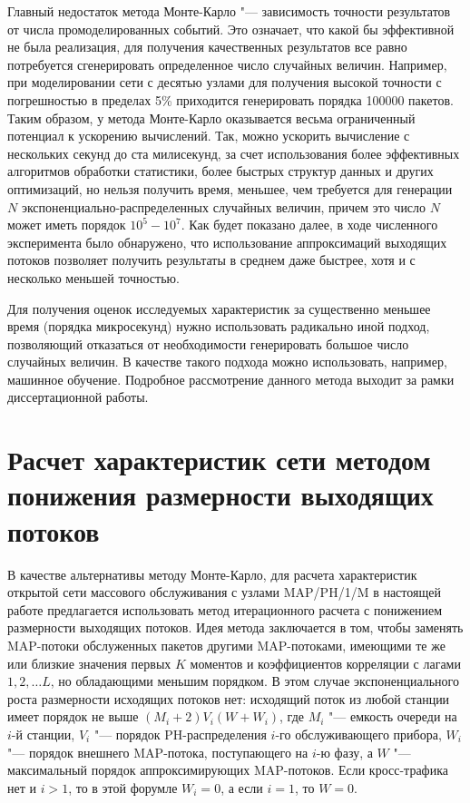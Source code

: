 Главный недостаток метода Монте-Карло "--- зависимость точности результатов от числа промоделированных событий. Это означает, что какой бы эффективной не была реализация, для получения качественных результатов все равно потребуется сгенерировать определенное число случайных величин. Например, при моделировании сети с десятью узлами для получения высокой точности с погрешностью в пределах 5\% приходится генерировать порядка 100000 пакетов. Таким образом, у метода Монте-Карло оказывается весьма ограниченный потенциал к ускорению вычислений. Так, можно ускорить вычисление с нескольких секунд до ста милисекунд, за счет использования более эффективных алгоритмов обработки статистики, более быстрых структур данных и других оптимизаций, но нельзя получить время, меньшее, чем требуется для генерации $N$ экспоненциально-распределенных случайных величин, причем это число $N$ может иметь порядок $10^5-10^7$. Как будет показано далее, в ходе численного эксперимента было обнаружено, что использование аппроксимаций выходящих потоков позволяет получить результаты в среднем даже быстрее, хотя и с несколько меньшей точностью.

Для получения оценок исследуемых характеристик за существенно меньшее время (порядка микросекунд) нужно использовать радикально иной подход, позволяющий отказаться от необходимости генерировать большое число случайных величин. В качестве такого подхода можно использовать, например, машинное обучение. Подробное рассмотрение данного метода выходит за рамки диссертационной работы.


\section{Расчет характеристик сети методом понижения размерности выходящих потоков}\label{sec:ch4_approx}

В качестве альтернативы методу Монте-Карло, для расчета характеристик открытой сети массового обслуживания с узлами MAP/PH/1/M в настоящей работе предлагается использовать метод итерационного расчета с понижением размерности выходящих потоков. Идея метода заключается в том, чтобы заменять MAP-потоки обслуженных пакетов другими MAP-потоками, имеющими те же или близкие значения первых $K$ моментов и коэффициентов корреляции с лагами $1, 2, \dots L$, но обладающими меньшим порядком. В этом случае экспоненциального роста размерности исходящих потоков нет: исходящий поток из любой станции имеет порядок не выше $(M_i + 2) V_i (W + W_i)$, где $M_i$ "--- емкость очереди на $i$-й станции, $V_i$ "--- порядок PH-распределения $i$-го обслуживающего прибора, $W_i$ "--- порядок внешнего MAP-потока, поступающего на $i$-ю фазу, а $W$ "--- максимальный порядок аппроксимирующих MAP-потоков. Если кросс-трафика нет и $i > 1$, то в этой форумле $W_i = 0$, а если $i = 1$, то $W = 0$.

